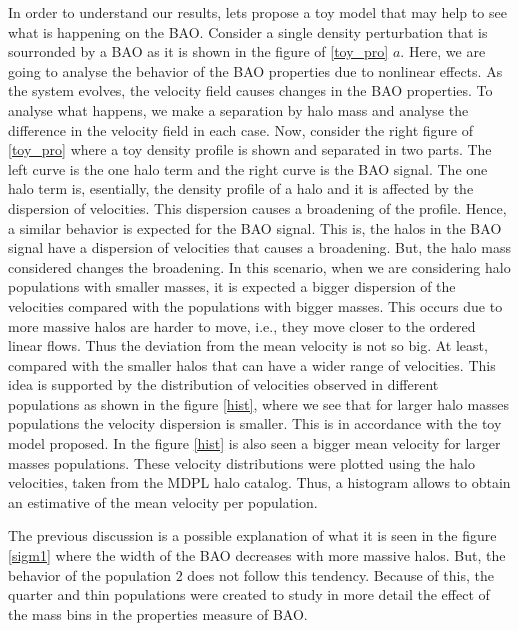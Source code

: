 In order to understand our results, lets propose a toy model that may help 
to see what is happening on the BAO.
Consider a single density perturbation that is sourronded 
by a BAO as it is shown in the figure of \ref{toy_pro} $a$. 
Here, we are going to analyse the behavior of the BAO properties due to nonlinear 
effects. As the system evolves, the velocity field causes changes in the BAO properties. 
To analyse what happens, we make a separation by halo mass and analyse the difference
in the velocity field in each case. 
Now, consider the right figure of \ref{toy_pro} where a toy density profile is shown 
and separated in two parts. The left curve is 
the one halo term  and the right curve is the BAO signal. 
The one halo term is, esentially, the density profile of a halo 
and it is affected by the dispersion of velocities. 
This dispersion causes a broadening of the profile. Hence, a similar behavior 
is expected for the BAO signal. This is, the halos 
in the BAO signal have a dispersion of velocities that causes a broadening.
But, the halo mass considered changes the broadening. 
In this scenario, when we are considering halo populations with smaller 
masses, it is expected a bigger dispersion of the velocities compared with the populations 
with bigger masses. 	This occurs due to more massive halos are harder to move, 
i.e., they move closer to the ordered linear flows. Thus the 
deviation from the mean velocity is not so big. At least,  compared  with the smaller halos 
that can have a wider range of velocities. This idea is supported by the distribution
of velocities observed in different populations as shown in the figure \ref{hist}, where
we see that for larger halo masses populations the velocity dispersion is smaller. This is
in accordance with the toy model proposed. 
In the figure \ref{hist} is also seen a bigger mean velocity for larger masses populations. 
These velocity distributions were plotted using the halo velocities, taken from the MDPL halo catalog. Thus, a histogram allows to obtain an estimative of the mean velocity per population. 


The previous discussion is a possible explanation of what it is seen in the
figure \ref{sigm1} where the width of the BAO decreases with more massive halos.
But, the behavior of the population $2$ does not follow this tendency. Because of this,
the quarter and thin populations were created to study in more detail the effect of
the mass bins in the properties measure of BAO. 



